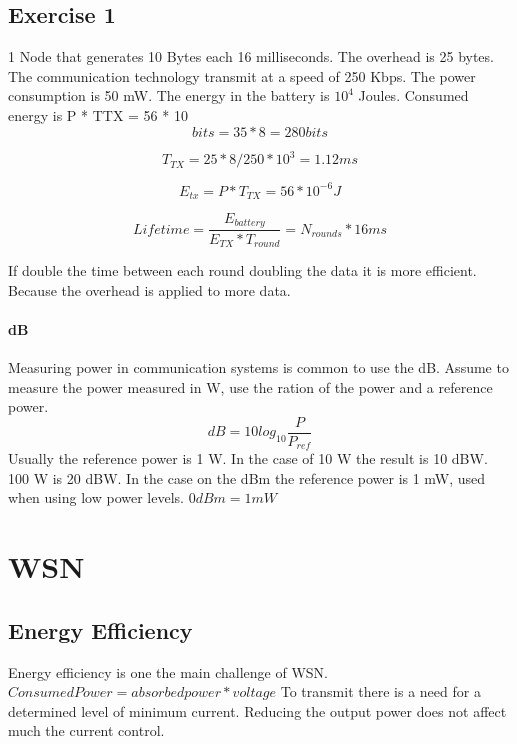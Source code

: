 \documentclass[]{article}
\begin{document}
\subsection{Exercise 1}
1 Node that generates 10 Bytes each 16 milliseconds. The overhead is 25 bytes.  The communication technology transmit at a speed of 250 Kbps. The power consumption is 50 mW. The energy in the battery is $ 10^{4} $ Joules. Consumed energy is P * TTX = 56 * 10
\begin{equation}\label{a}
	bits = 35 * 8 = 280 bits
\end{equation}

\begin{equation}\label{b}
	T_{TX} = 25 * 8/250 * 10^{3} = 1.12 ms
\end{equation}

\begin{equation}\label{c}
	E_{tx} = P * T_{TX} = 56 * 10^{-6} J
\end{equation}

\begin{equation}\label{d}
	Lifetime = \frac{E_{battery}}{E_{TX} * T_{round}} = N_{rounds}* 16ms
\end{equation}

If double the time between each round doubling the data it is more efficient. Because the overhead is applied to more data. 

\paragraph{dB}
Measuring power in communication systems is common to use the dB. Assume to measure the power measured in W, use the ration of the power and a reference power. 
\begin{equation}\label{e}
	dB = 10 log_{10} \frac{P}{P_{ref}}
\end{equation}
Usually the reference power is 1 W. In the case of 10 W the result is 10 dBW. 100 W is 20 dBW. In the case on the dBm the reference power is 1 mW, used when using low power levels. $ 0 dBm = 1 mW $
\section{WSN}
\subsection{Energy Efficiency}
Energy efficiency is one the main challenge of WSN. $ Consumed Power = absorbed power * voltage $ To transmit there is a need for a determined level of minimum current. Reducing the output power does not affect much the current control. 
\end{document}
